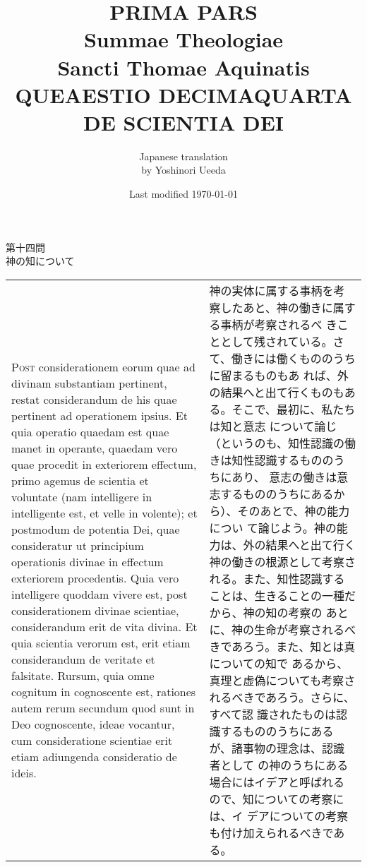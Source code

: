 \documentclass[10pt]{jsarticle} %
\title{{\bf PRIMA PARS}\\{\HUGE Summae Theologiae}\\Sancti Thomae
Aquinatis\\{\sffamily QUEAESTIO DECIMAQUARTA}\\DE SCIENTIA DEI}
\author{Japanese translation\\by Yoshinori {\sc Ueeda}}
\date{Last modified \today}
\begin{document}
\maketitle
\pagestyle{fancy}

\begin{center}
{\Large 第十四問\\神の知について}
\end{center}

\begin{longtable}{p{21em}p{21em}}

{\huge P}{\scshape ost} considerationem eorum quae ad divinam
substantiam pertinent, restat considerandum de his quae pertinent ad
operationem ipsius. Et quia operatio quaedam est quae manet in operante,
quaedam vero quae procedit in exteriorem effectum, primo agemus de
scientia et voluntate (nam intelligere in intelligente est, et velle in
volente); et postmodum de potentia Dei, quae consideratur ut principium
operationis divinae in effectum exteriorem procedentis. Quia vero
intelligere quoddam vivere est, post considerationem divinae scientiae,
considerandum erit de vita divina. Et quia scientia verorum est, erit
etiam considerandum de veritate et falsitate. Rursum, quia omne cognitum
in cognoscente est, rationes autem rerum secundum quod sunt in Deo
cognoscente, ideae vocantur, cum consideratione scientiae erit etiam
adiungenda consideratio de ideis.

&

神の実体に属する事柄を考察したあと、神の働きに属する事柄が考察されるべ
きこととして残されている。さて、働きには働くもののうちに留まるものもあ
れば、外の結果へと出て行くものもある。そこで、最初に、私たちは知と意志
について論じ（というのも、知性認識の働きは知性認識するもののうちにあり、
意志の働きは意志するもののうちにあるから）、そのあとで、神の能力につい
て論じよう。神の能力は、外の結果へと出て行く神の働きの根源として考察さ
れる。また、知性認識することは、生きることの一種だから、神の知の考察の
あとに、神の生命が考察されるべきであろう。また、知とは真についての知で
あるから、真理と虚偽についても考察されるべきであろう。さらに、すべて認
識されたものは認識するもののうちにあるが、諸事物の理念は、認識者として
の神のうちにある場合にはイデアと呼ばれるので、知についての考察には、イ
デアについての考察も付け加えられるべきである。


\\


\end{longtable}
\end{document}
